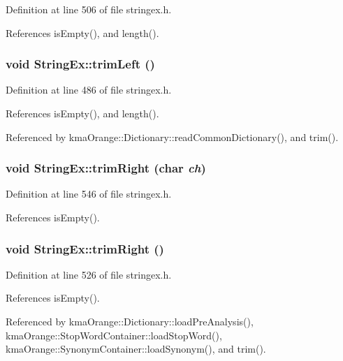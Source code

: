 Definition at line 506 of file stringex.h.

References isEmpty(), and length().\hypertarget{classStringEx_a9416c29e6eaaa05c8831d4320019717}{
\subsubsection[{trimLeft}]{\setlength{\rightskip}{0pt plus 5cm}void StringEx::trimLeft ()}}
\label{classStringEx_a9416c29e6eaaa05c8831d4320019717}




Definition at line 486 of file stringex.h.

References isEmpty(), and length().

Referenced by kmaOrange::Dictionary::readCommonDictionary(), and trim().\hypertarget{classStringEx_5bec13a31e3517290de6b15e2f9fe336}{
\subsubsection[{trimRight}]{\setlength{\rightskip}{0pt plus 5cm}void StringEx::trimRight (char {\em ch})}}
\label{classStringEx_5bec13a31e3517290de6b15e2f9fe336}




Definition at line 546 of file stringex.h.

References isEmpty().\hypertarget{classStringEx_ca9136e18b9f519ab85b04181d11ddd3}{
\subsubsection[{trimRight}]{\setlength{\rightskip}{0pt plus 5cm}void StringEx::trimRight ()}}
\label{classStringEx_ca9136e18b9f519ab85b04181d11ddd3}




Definition at line 526 of file stringex.h.

References isEmpty().

Referenced by kmaOrange::Dictionary::loadPreAnalysis(), kmaOrange::StopWordContainer::loadStopWord(), kmaOrange::SynonymContainer::loadSynonym(), and trim().

